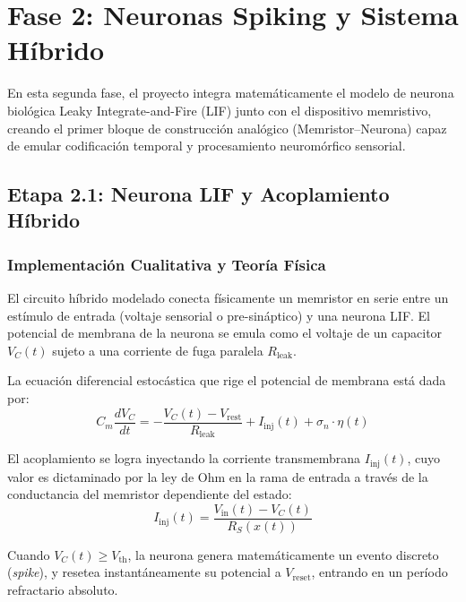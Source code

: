 
\chapter{Fase 2: Neuronas Spiking y Sistema Híbrido}
\label{ch:fase2}

En esta segunda fase, el proyecto integra matemáticamente el modelo de neurona biológica Leaky Integrate-and-Fire (LIF) junto con el dispositivo memristivo, creando el primer bloque de construcción analógico (Memristor--Neurona) capaz de emular codificación temporal y procesamiento neuromórfico sensorial.

\section{Etapa 2.1: Neurona LIF y Acoplamiento Híbrido}
\label{sec:etapa2_1}

\subsection{Implementación Cualitativa y Teoría Física}
El circuito híbrido modelado conecta físicamente un memristor en serie entre un estímulo de entrada (voltaje sensorial o pre-sináptico) y una neurona LIF. El potencial de membrana de la neurona se emula como el voltaje de un capacitor $V_C(t)$ sujeto a una corriente de fuga paralela $R_{\mathrm{leak}}$.

La ecuación diferencial estocástica que rige el potencial de membrana está dada por:
\begin{equation}
C_m \frac{dV_C}{dt} = -\frac{V_C(t) - V_{\mathrm{rest}}}{R_{\mathrm{leak}}} + I_{\mathrm{inj}}(t) + \sigma_n \cdot \eta(t)
\label{eq:lif_hibrida}
\end{equation}

El acoplamiento se logra inyectando la corriente transmembrana $I_{\mathrm{inj}}(t)$, cuyo valor es dictaminado por la ley de Ohm en la rama de entrada a través de la conductancia del memristor dependiente del estado:
\begin{equation}
I_{\mathrm{inj}}(t) = \frac{V_{\mathrm{in}}(t) - V_C(t)}{R_S(x(t))}
\label{eq:i_inyectada}
\end{equation}

Cuando $V_C(t) \geq V_{\mathrm{th}}$, la neurona genera matemáticamente un evento discreto (\textit{spike}), y resetea instantáneamente su potencial a $V_{\mathrm{reset}}$, entrando en un período refractario absoluto.

